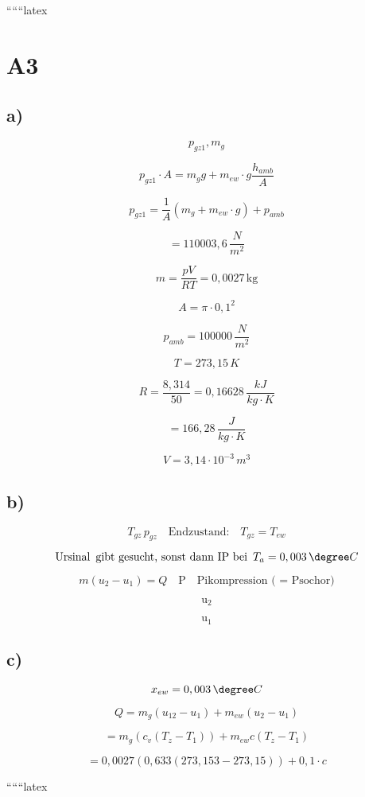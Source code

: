 
``````latex


\section*{A3}

\subsection*{a)}

\[
p_{gz1}, m_g
\]

\[
p_{gz1} \cdot A = m_g g + m_{ew} \cdot g \frac{h_{amb}}{A}
\]

\[
p_{gz1} = \frac{1}{A} (m_g + m_{ew} \cdot g) + p_{amb}
\]

\[
= 110003,6 \, \frac{N}{m^2}
\]

\[
m = \frac{p V}{R T} = 0,0027 \, \text{kg}
\]

\[
A = \pi \cdot 0,1^2
\]

\[
p_{amb} = 100000 \, \frac{N}{m^2}
\]

\[
T = 273,15 \, K
\]

\[
R = \frac{8,314}{50} = 0,16628 \, \frac{kJ}{kg \cdot K}
\]

\[
= 166,28 \, \frac{J}{kg \cdot K}
\]

\[
V = 3,14 \cdot 10^{-3} \, m^3
\]

\subsection*{b)}

\[
T_{gz} \, p_{gz} \quad \text{Endzustand:} \quad T_{gz} = T_{ew}
\]

\[
\text{Ursinal } \, \text{gibt gesucht, sonst dann IP bei } \, T_a = 0,003 \, \degree C
\]

\[
m (u_2 - u_1) = Q \quad \text{P} \quad \text{Pikompression ( = Psochor)}
\]

\[
\text{u}_2
\]

\[
\text{u}_1
\]

\subsection*{c)}

\[
x_{ew} = 0,003 \, \degree C
\]

\[
Q = m_g (u_{12} - u_1) + m_{ew} (u_2 - u_1)
\]

\[
= m_g (c_v (T_{z} - T_1)) + m_{ew} c (T_{z} - T_1)
\]

\[
= 0,0027 (0,633 (273,153 - 273,15)) + 0,1 \cdot c
\]

``````latex



